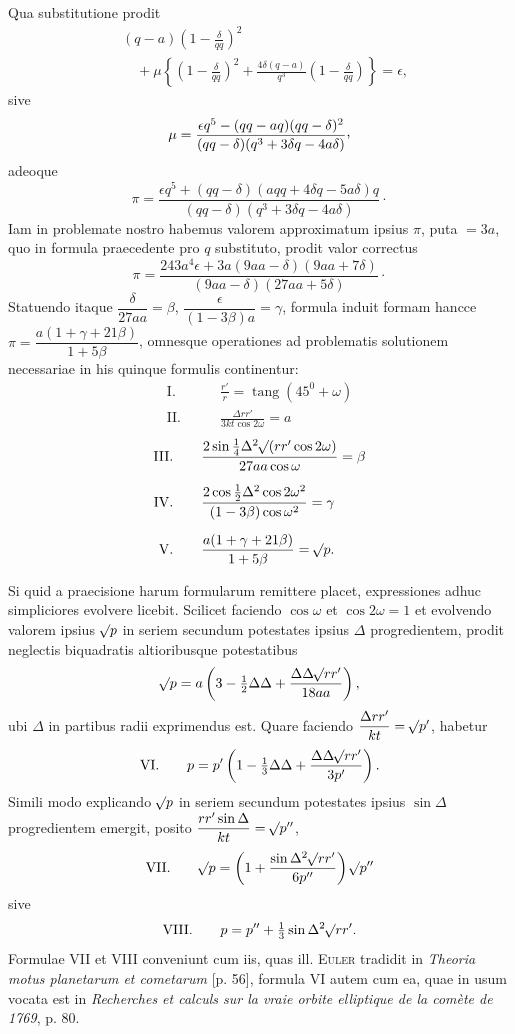 Qua substitutione prodit
\[
\begin{aligned}
&(q-a)\left(1-\frac{\delta}{qq}\right)^2\\[4pt]
&\quad+\mu\left\{\left(1-\frac{\delta}{qq}\right)^2+\frac{4\delta(q-a)}{q^3}\left(1-\frac{\delta}{qq}\right)\right\}=\epsilon,
\end{aligned}
\]
sive
\[
\mu=\frac{\epsilon q^5-(qq-aq)(qq-\delta)^2}{(qq-\delta)(q^3+3\delta q-4a\delta)}\mathpunct{\raisebox{.45ex}{,}}
\]
adeoque
\[
\pi=\frac{\epsilon q^5+(qq-\delta)(aqq+4\delta q-5a\delta)q}{(qq-\delta)(q^3+3\delta q-4a\delta)}\mathpunct{\cdot}
\]
Iam in problemate nostro habemus valorem approximatum ipsius $\pi$, puta $=3a$, quo in formula praecedente pro $q$ substituto, prodit valor correctus
\[
\pi=\frac{243a^4\epsilon+3a(9aa-\delta)(9aa+7\delta)}{(9aa-\delta)(27aa+5\delta)}\mathpunct{\cdot}
\]
Statuendo itaque $\dfrac{\delta}{27aa}=\beta$, $\dfrac{\epsilon}{(1-3\beta)a}=\gamma$, formula induit formam hancce $\pi=\dfrac{a(1+\gamma+21\beta)}{1+5\beta}$, omnesque operationes ad problematis solutionem necessariae in his quinque formulis continentur:
\[
\begin{aligned}
\mathrm{I.}\qquad&\frac{r'}{r}=\operatorname{tang}(45^0+\omega)\\[6pt]
\mathrm{II.}\qquad&\frac{\Delta rr'}{3kt\cos2\omega}=a
\end{aligned}
\]
\[
\begin{aligned}
\mathrm{III.}\qquad&\frac{2\sin\tfrac14\Delta^2\mathord{{}^{}\!\surd}(rr'\cos2\omega)}{27aa\cos\omega}=\beta\\[6pt]
\mathrm{IV.}\qquad&\frac{2\cos\tfrac12\Delta^2\cos2\omega^2}{(1-3\beta)\cos\omega^2}=\gamma\\[6pt]
\mathrm{V.}\qquad&\frac{a(1+\gamma+21\beta)}{1+5\beta}=\mathord{{}^{}\!\surd}p.
\end{aligned}
\]

Si quid a praecisione harum formularum remittere placet, expressiones adhuc simpliciores evolvere licebit. Scilicet faciendo $\cos\omega$ et $\cos2\omega=1$ et evolvendo valorem ipsius $\mathord{{}^{}\!\surd}p$ in seriem secundum potestates ipsius $\Delta$ progredientem, prodit neglectis biquadratis altioribusque potestatibus
\[
\mathord{{}^{}\!\surd}p=a\left(3-\tfrac12\Delta\Delta+\frac{\Delta\Delta\mathord{{}^{}\!\surd}rr'}{18aa}\right),
\]
ubi $\Delta$ in partibus radii exprimendus est. Quare faciendo $\dfrac{\Delta rr'}{kt}=\mathord{{}^{}\!\surd}p'$, habetur
\[
\mathrm{VI.}\qquad p=p'\left(1-\tfrac13\Delta\Delta+\frac{\Delta\Delta\mathord{{}^{}\!\surd}rr'}{3p'}\right).
\]
Simili modo explicando $\mathord{{}^{}\!\surd}p$ in seriem secundum potestates ipsius $\sin\Delta$ progredientem emergit, posito $\dfrac{rr'\sin\Delta}{kt}=\mathord{{}^{}\!\surd}p''$,
\[
\mathrm{VII.}\qquad\mathord{{}^{}\!\surd}p=\left(1+\frac{\sin\Delta^2\mathord{{}^{}\!\surd}rr'}{6p''}\right)\mathord{{}^{}\!\surd}p''
\]
sive
\[
\mathrm{VIII.}\qquad p=p''+\tfrac13\sin\Delta^2\mathord{{}^{}\!\surd}rr'.
\]
Formulae VII et VIII conveniunt cum iis, quas ill. \textsc{Euler} tradidit in \textit{Theoria motus planetarum et cometarum} [p. 56], formula VI autem cum ea, quae in usum vocata est in \textit{Recherches et calculs sur la vraie orbite elliptique de la comète de 1769}, p. 80.
